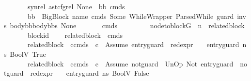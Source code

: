\begin{isabellebody}
\ \ \ \ \ \ \ syn{\isacharunderscore}{\kern0pt}rel{\isacharcolon}{\kern0pt}\ {\isachardoublequoteopen}ast{\isacharunderscore}{\kern0pt}cfg{\isacharunderscore}{\kern0pt}rel\ None\ {\isacharbrackleft}{\kern0pt}{\isacharbrackright}{\kern0pt}\ bb\ cmds{\isachardoublequoteclose}\isanewline
\ \ \ \ \ \ \ {\isachardoublequoteopen}bb\ {\isacharequal}{\kern0pt}\ {\isacharparenleft}{\kern0pt}BigBlock\ name\ cmds\ {\isacharparenleft}{\kern0pt}Some\ {\isacharparenleft}{\kern0pt}WhileWrapper\ {\isacharparenleft}{\kern0pt}ParsedWhile\ guard\ invs\ {\isacharparenleft}{\kern0pt}body{\isacharunderscore}{\kern0pt}bb{}{\isacharhash}{\kern0pt}body{\isacharunderscore}{\kern0pt}bbs{\isacharparenright}{\kern0pt}{\isacharparenright}{\kern0pt}{\isacharparenright}{\kern0pt}{\isacharparenright}{\kern0pt}\ None{\isacharparenright}{\kern0pt}{\isachardoublequoteclose}\isanewline
\ \ \ \ \ \ \ {\isachardoublequoteopen}cmds\ {\isasymnoteq}\ {\isacharbrackleft}{\kern0pt}{\isacharbrackright}{\kern0pt}{\isachardoublequoteclose}\isanewline
\ \ \ \ \ \ \ {\isachardoublequoteopen}node{\isacharunderscore}{\kern0pt}to{\isacharunderscore}{\kern0pt}block{\isacharparenleft}{\kern0pt}G{\isacharparenright}{\kern0pt}\ {\isacharbang}{\kern0pt}\ n\ {\isacharequal}{\kern0pt}\ related{\isacharunderscore}{\kern0pt}block{\isachardoublequoteclose}\isanewline
\ \ \ \ \ \ \ block{\isacharunderscore}{\kern0pt}id{\isacharcolon}{\kern0pt}\isanewline
\ \ \ \ {\isachardoublequoteopen}{\isacharparenleft}{\kern0pt}related{\isacharunderscore}{\kern0pt}block\ {\isacharequal}{\kern0pt}\ cmds{\isacharparenright}{\kern0pt}\ {\isasymor}\ \isanewline
\ \ \ \ \ \ \ {\isacharparenleft}{\kern0pt}related{\isacharunderscore}{\kern0pt}block\ {\isacharequal}{\kern0pt}\ c{\isacharhash}{\kern0pt}cmds{\isacharparenright}{\kern0pt}\ {\isasymand}\ c\ {\isacharequal}{\kern0pt}\ Assume\ entry{\isacharunderscore}{\kern0pt}guard\ {\isasymand}\ {\isacharparenleft}{\kern0pt}red{\isacharunderscore}{\kern0pt}expr\ {\isasymLambda}\ {\isasymGamma}\ {\isasymOmega}\ entry{\isacharunderscore}{\kern0pt}guard\ ns{}\ {\isacharparenleft}{\kern0pt}BoolV\ True{\isacharparenright}{\kern0pt}{\isacharparenright}{\kern0pt}\ {\isasymor}\ \isanewline
\ \ \ \ \ \ \ {\isacharparenleft}{\kern0pt}related{\isacharunderscore}{\kern0pt}block\ {\isacharequal}{\kern0pt}\ c{\isacharhash}{\kern0pt}cmds{\isacharparenright}{\kern0pt}\ {\isasymand}\ c\ {\isacharequal}{\kern0pt}\ Assume\ not{\isacharunderscore}{\kern0pt}guard\ {\isasymand}\ {\isacharparenleft}{\kern0pt}UnOp\ Not\ entry{\isacharunderscore}{\kern0pt}guard\ {\isasymsim}\ not{\isacharunderscore}{\kern0pt}guard{\isacharparenright}{\kern0pt}\ {\isasymand}\ {\isacharparenleft}{\kern0pt}red{\isacharunderscore}{\kern0pt}expr\ {\isasymLambda}\ {\isasymGamma}\ {\isasymOmega}\ entry{\isacharunderscore}{\kern0pt}guard\ ns{}\ {\isacharparenleft}{\kern0pt}BoolV\ False{\isacharparenright}{\kern0pt}{\isacharparenright}{\kern0pt}{\isachardoublequoteclose}\isanewline

\end{isabellebody}
